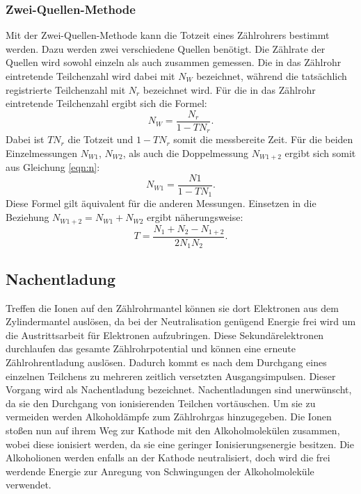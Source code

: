 \subsubsection{Zwei-Quellen-Methode}
Mit der Zwei-Quellen-Methode kann die Totzeit eines Zählrohrers bestimmt werden.
Dazu werden zwei verschiedene Quellen benötigt. Die Zählrate der Quellen wird sowohl einzeln
als auch zusammen gemessen. Die in das Zählrohr eintretende Teilchenzahl wird dabei mit $N_W$
bezeichnet, während die tatsächlich registrierte Teilchenzahl mit $N_r$
bezeichnet wird. Für die in das Zählrohr eintretende Teilchenzahl ergibt sich die
Formel:
\begin{equation}
  N_W=\frac{N_r}{1-TN_r}.
  \label{eqn:n}
\end{equation}
Dabei ist $TN_r$ die Totzeit und $1-TN_r$ somit die messbereite Zeit.
Für die beiden Einzelmessungen $N_{W1}$, $N_{W2}$, als auch die Doppelmessung $N_{W1+2}$ ergibt sich somit aus
Gleichung \ref{eqn:n}:
\begin{equation}
  N_{W1}=\frac{N1}{1-TN_1}.
\end{equation}
Diese Formel gilt äquivalent für die anderen Messungen.
Einsetzen in die Beziehung $N_{W1+2}=N_{W1}+N_{W2}$ ergibt näherungsweise:
\begin{equation}
  T=\frac{N_1+ N_2- N_{1+2}}{2N_1 N_2}.
  \label{eqn:tot}
\end{equation}

\subsection{Nachentladung}
Treffen die Ionen auf den Zählrohrmantel können sie dort Elektronen aus dem
Zylindermantel auslösen, da bei der Neutralisation genügend Energie frei wird
um die Austrittsarbeit für Elektronen aufzubringen. Diese Sekundärelektronen
durchlaufen das gesamte Zählrohrpotential und können eine erneute Zählrohrentladung
auslösen. Dadurch kommt es nach dem Durchgang eines einzelnen Teilchens zu mehreren zeitlich
versetzten Ausgangsimpulsen. Dieser Vorgang wird als Nachentladung bezeichnet.
Nachentladungen sind unerwünscht, da sie den Durchgang von ionisierenden Teilchen
vortäuschen. Um sie zu vermeiden werden Alkoholdämpfe zum Zählrohrgas hinzugegeben.
Die Ionen stoßen nun auf ihrem Weg zur Kathode mit den Alkoholmolekülen zusammen, wobei
diese ionisiert werden, da sie eine geringer Ionisierungsenergie besitzen.
Die Alkoholionen werden enfalls an der Kathode neutralisiert, doch wird die frei werdende
Energie zur Anregung von Schwingungen der Alkoholmoleküle verwendet.

